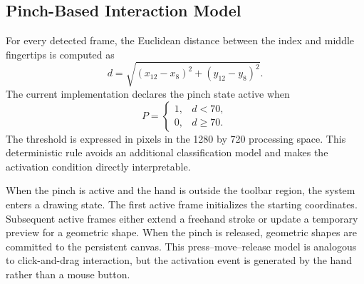 \documentclass[conference]{IEEEtran}
\begin{document}
\subsection{Pinch-Based Interaction Model}
For every detected frame, the Euclidean distance between the index and middle fingertips is computed as
\begin{equation}
 d = \sqrt{(x_{12}-x_8)^2 + (y_{12}-y_8)^2}.
\end{equation}
The current implementation declares the pinch state active when
\begin{equation}
 P =
 \begin{cases}
 1, & d < 70,\\
 0, & d \geq 70.
 \end{cases}
\end{equation}
The threshold is expressed in pixels in the 1280 by 720 processing space. This deterministic rule avoids an additional classification model and makes the activation condition directly interpretable.

When the pinch is active and the hand is outside the toolbar region, the system enters a drawing state. The first active frame initializes the starting coordinates. Subsequent active frames either extend a freehand stroke or update a temporary preview for a geometric shape. When the pinch is released, geometric shapes are committed to the persistent canvas. This press--move--release model is analogous to click-and-drag interaction, but the activation event is generated by the hand rather than a mouse button.
\end{document}
